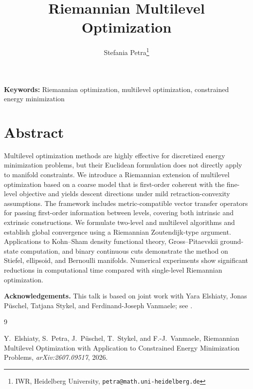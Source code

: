 \documentclass[11pt]{article}
\title{\bfseries Riemannian Multilevel Optimization}
\author{
Stefania Petra\thanks{IWR, Heidelberg University,
\texttt{petra@math.uni-heidelberg.de}}
}
\date{}
\begin{document}
\maketitle

\vspace{-1em}

\noindent
\textbf{Keywords:}
Riemannian optimization, multilevel optimization, constrained energy minimization
\vspace{0.5em}


\vspace{1em}

\section*{Abstract}

Multilevel optimization methods are highly effective for discretized energy minimization problems, but their Euclidean formulation does not directly apply to manifold constraints. We introduce a Riemannian extension of multilevel optimization based on a coarse model that is first-order coherent with the fine-level objective and yields descent directions under mild retraction-convexity assumptions. The framework includes metric-compatible vector transfer operators for passing first-order information between levels, covering both intrinsic and extrinsic constructions.
We formulate two-level and multilevel algorithms and establish global convergence using a Riemannian Zoutendijk-type argument. Applications to Kohn–Sham density functional theory, Gross–Pitaevskii ground-state computation, and binary continuous cuts demonstrate the method on Stiefel, ellipsoid, and Bernoulli manifolds. Numerical experiments show significant reductions in computational time compared with single-level Riemannian optimization.
\vspace{1em}

\noindent
\textbf{Acknowledgements.}
This talk is based on joint work with Yara Elshiaty, Jonas P\"uschel, Tatjana Stykel, and Ferdinand-Joseph Vanmaele; see \cite{ElshiatyEtAl2026}.

\vspace{1em}

\begin{thebibliography}{9}

Y.~Elshiaty, S.~Petra, J.~Püschel, T.~Stykel, and F.-J.~Vanmaele,
\newblock 
{{Riemannian Multilevel Optimization with Application to Constrained Energy Minimization Problems}},
\newblock \emph{arXiv:2607.09517}, 2026.

\end{thebibliography}
\end{document}
